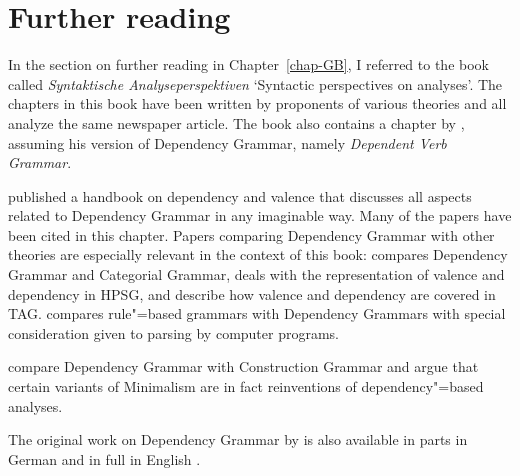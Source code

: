 \section*{Further reading}

In the section on further reading in Chapter~\ref{chap-GB}, I referred to the book called
\emph{Syntaktische Analyseperspektiven} `Syntactic perspectives on analyses'. The chapters in this book have been written by proponents of various theories
and all analyze the same newspaper article. The book also contains a chapter by \citet{Engel2014a},
assuming his version of Dependency Grammar, namely \emph{Dependent Verb Grammar}.

\citet*{AEEHHL2003a-ed-not-crossreferenced,AEEHHL2006a-ed-not-crossreferenced} published a handbook on dependency and valence that discusses
all aspects related to Dependency Grammar in any imaginable way. Many of the papers have been cited
in this chapter. Papers comparing Dependency Grammar with other theories are especially relevant
in the context of this book: \citet{Lobin2003a} compares Dependency Grammar and
Categorial Grammar, \citet{Oliva2003a} deals with the representation of valence and dependency in
HPSG, and \citet*{BJR2003a-u} describe how valence and dependency are covered in
TAG. \citet{Hellwig2006a} compares rule"=based grammars with Dependency Grammars with special
consideration given to parsing by computer programs.

\citet{OG2012a-u} compare Dependency Grammar with Construction Grammar and \citet*{OPG2011a} argue
that certain variants of Minimalism are in fact reinventions of dependency"=based analyses.

The original work on Dependency Grammar by \citet{Tesniere59a-u} is also available in parts in German
\citep{Tesniere80a-u} and in full in English \citep{Tesniere2015a-not-crossreferenced}.











